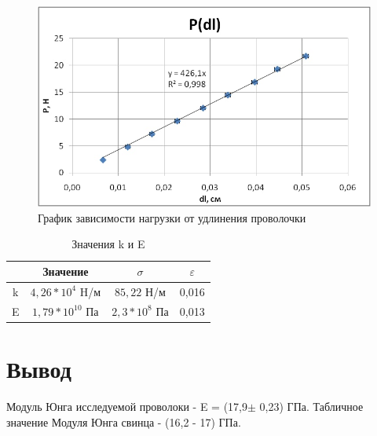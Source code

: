 \documentclass[a4paper,14pt]{extarticle}
\begin{document}
	\begin{figure}[H]
		\begin{center}
			\includegraphics[scale = 0.95]{"graph_1.jpg"}
			\caption{График зависимости нагрузки от удлинения проволочки}
		\end{center}
	\end{figure}
	\begin{table}[!ht]
		\centering
		\begin{tabular}{|c|c|c|c|}
			\hline
			&Значение&$\sigma$&$\varepsilon$\\
			\hline
			k&$4,26*10^4$ H/м&$85,22$ Н/м&0,016\\
			\hline
			E&$1,79*10^{10}$ Па&$ 2,3*10^{8}$ Па&0,013\\
			\hline
		\end{tabular}
	\caption{Значения k и E}
	\end{table}
\section{Вывод}
	Модуль Юнга исследуемой проволоки - E = (17,9$\pm$ 0,23) ГПа. Табличное значение Модуля Юнга свинца - (16,2 - 17) ГПа.  
\end{document}
